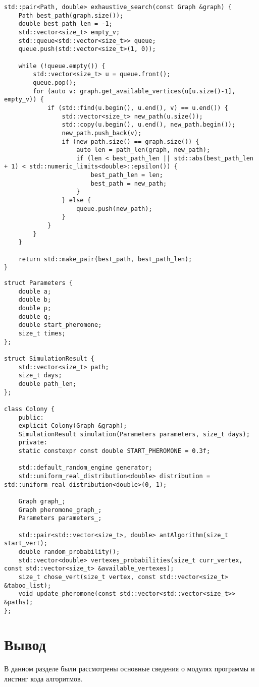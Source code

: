 \documentclass[12pt]{report}
\begin{document}
\begin{lstlisting}[label=some-code,caption=Алгоритм полного перебора]
std::pair<Path, double> exhaustive_search(const Graph &graph) {
	Path best_path(graph.size());
	double best_path_len = -1;
	std::vector<size_t> empty_v;
	std::queue<std::vector<size_t>> queue;
	queue.push(std::vector<size_t>(1, 0));
	
	while (!queue.empty()) {
		std::vector<size_t> u = queue.front();
		queue.pop();
		for (auto v: graph.get_available_vertices(u[u.size()-1], empty_v)) {
			if (std::find(u.begin(), u.end(), v) == u.end()) {
				std::vector<size_t> new_path(u.size());
				std::copy(u.begin(), u.end(), new_path.begin());
				new_path.push_back(v);
				if (new_path.size() == graph.size()) {
					auto len = path_len(graph, new_path);
					if (len < best_path_len || std::abs(best_path_len + 1) < std::numeric_limits<double>::epsilon()) {
						best_path_len = len;
						best_path = new_path;
					}
				} else {
					queue.push(new_path);
				}
			}
		}
	}
	
	return std::make_pair(best_path, best_path_len);
}
\end{lstlisting}

\begin{lstlisting}[label=some-code,caption= Класс муравьиной колонии]
struct Parameters {
	double a;
	double b;
	double p;
	double q;
	double start_pheromone;
	size_t times;
};

struct SimulationResult {
	std::vector<size_t> path;
	size_t days;
	double path_len;
};

class Colony {
	public:
	explicit Colony(Graph &graph);
	SimulationResult simulation(Parameters parameters, size_t days);
	private:
	static constexpr const double START_PHEROMONE = 0.3f;
	
	std::default_random_engine generator;
	std::uniform_real_distribution<double> distribution = std::uniform_real_distribution<double>(0, 1);
	
	Graph graph_;
	Graph pheromone_graph_;
	Parameters parameters_;
	
	std::pair<std::vector<size_t>, double> antAlgorithm(size_t start_vert);
	double random_probability();
	std::vector<double> vertexes_probabilities(size_t curr_vertex, const std::vector<size_t> &available_vertexes);
	size_t chose_vert(size_t vertex, const std::vector<size_t> &taboo_list);
	void update_pheromone(const std::vector<std::vector<size_t>> &paths);
};
\end{lstlisting}

\section*{Вывод}
В данном разделе были рассмотрены основные сведения о модулях программы и листинг кода алгоритмов.
\end{document}
